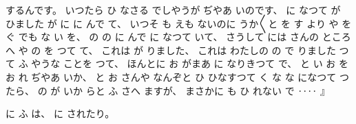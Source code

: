 するんです。
%
いつたら
ひ
なさる
でしやうが
ぢやあ
%
いのです、
%
に
なつて
が
ひました
が
に
に
んで
て、
%
いつそ
も
えも
ないのに
うか〳〵と
を
す
より
や
を
ぐ
でも
な
い
を、
%
の%
の
に
んで
に
なつて
いて、
%
さうして
には
さんの
ところへ
や%
の
を
つて
て、
%
これは
が
りました、
%
これは
わたしの
の
で
りました
つて
ふ
やうな
ことを
つて、
%
ほんとに
お
がまあ
に
なりきつて
で、
%
と
い
お
を
お
れ
ぢやあ
いか、
%
と
お
さんや
なんぞと
ひ
ひなすつて
く%
な
な
になつて
つたら、
%
の
が
いか
らと
ふ
さへ
ますが、
%
まさかに
も
ひ
れない
で
‥‥
』

%
に
ふ
は、
%
に
されたり。

